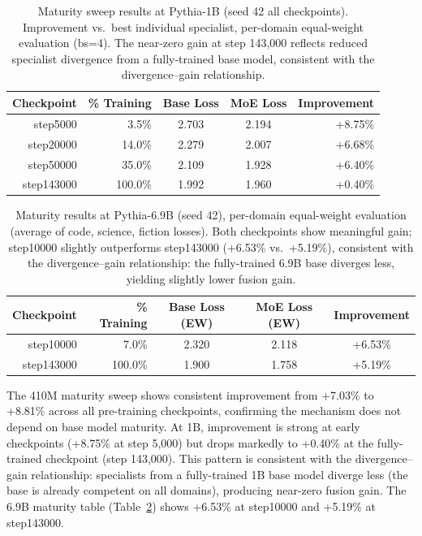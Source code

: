 \documentclass{article}
\begin{document}
\begin{table}[h]
\centering
\caption{Maturity sweep results at Pythia-1B (seed 42 all checkpoints). Improvement vs.\ best individual specialist, per-domain equal-weight evaluation (bs=4). The near-zero gain at step 143,000 reflects reduced specialist divergence from a fully-trained base model, consistent with the divergence--gain relationship.}
\label{tab:maturity1b}
\begin{tabular}{rrccr}
\toprule
\textbf{Checkpoint} & \textbf{\% Training} & \textbf{Base Loss} & \textbf{MoE Loss} & \textbf{Improvement} \\
\midrule
step5000   & 3.5\%   & 2.703 & 2.194 & +8.75\% \\
step20000  & 14.0\%  & 2.279 & 2.007 & +6.68\% \\
step50000  & 35.0\%  & 2.109 & 1.928 & +6.40\% \\
step143000 & 100.0\% & 1.992 & 1.960 & +0.40\% \\
\bottomrule
\end{tabular}
\end{table}

\begin{table}[h]
\centering
\caption{Maturity results at Pythia-6.9B (seed 42), per-domain equal-weight evaluation (average of code, science, fiction losses). Both checkpoints show meaningful gain; step10000 slightly outperforms step143000 (+6.53\% vs.\ +5.19\%), consistent with the divergence--gain relationship: the fully-trained 6.9B base diverges less, yielding slightly lower fusion gain.}
\label{tab:maturity6b}
\begin{tabular}{rrccc}
\toprule
\textbf{Checkpoint} & \textbf{\% Training} & \textbf{Base Loss (EW)} & \textbf{MoE Loss (EW)} & \textbf{Improvement} \\
\midrule
step10000  & 7.0\%   & 2.320 & 2.118 & +6.53\% \\
step143000 & 100.0\% & 1.900 & 1.758 & +5.19\% \\
\bottomrule
\end{tabular}
\end{table}

The 410M maturity sweep shows consistent improvement from +7.03\% to +8.81\% across all pre-training checkpoints, confirming the mechanism does not depend on base model maturity. At 1B, improvement is strong at early checkpoints (+8.75\% at step 5,000) but drops markedly to +0.40\% at the fully-trained checkpoint (step 143,000). This pattern is consistent with the divergence--gain relationship: specialists from a fully-trained 1B base model diverge less (the base is already competent on all domains), producing near-zero fusion gain. The 6.9B maturity table (Table~\ref{tab:maturity6b}) shows +6.53\% at step10000 and +5.19\% at step143000.
\end{document}
